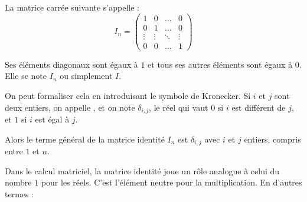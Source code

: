 % 
% 
% 
% 
% 
% 
% 
% 
% 


\diapo

La matrice carrée suivante s'appelle  : 
 \[
 I_n = \left(
 \begin{array}{cccc}
1 & 0 & \dots & 0\\
0& 1& \dots & 0\\
 \vdots& \vdots & \ddots  & \vdots\\
0 & 0 & \dots &1
\end{array}
\right)
 \]

Ses éléments diagonaux sont égaux à $1$ et tous ses autres éléments sont égaux à $0$.
Elle se note $I_n$ ou simplement $I$.

\change
On peut formaliser cela en introduisant le symbole de Kronecker.
Si $i$ et $j$ sont deux entiers, on appelle , et on note $\delta_{i,j}$, le réel qui vaut $0$ si $i$ est différent de $j$, et $1$ si $i$ est égal à $j$. 

\change
Alors le terme général de la matrice identité $I_{n}$ est $\delta_{i,j}$  avec $i$ et $j$ entiers, compris entre $1$ et $n$.


\diapo

Dans le calcul matriciel, la matrice identité joue un rôle
analogue à celui du nombre $1$ pour les réels.
C'est l'élément neutre pour la multiplication. En
d'autres termes :

